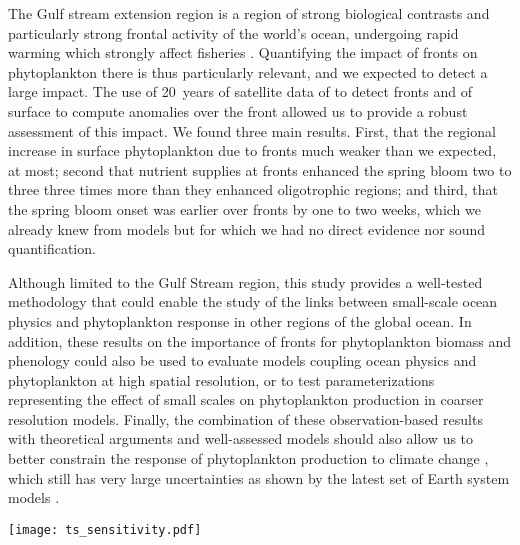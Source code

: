 \conclusions{}

The Gulf stream extension region is a region of strong biological contrasts and particularly strong frontal activity of the world's ocean, undergoing rapid warming which strongly affect fisheries \parencite{pershing_2015, neto_2021}.
Quantifying the impact of fronts on phytoplankton there is thus particularly relevant, and we expected to detect a large impact.
The use of 20~years of satellite data of  to detect fronts and of surface  to compute anomalies over the front allowed us to provide a robust assessment of this impact.
We found three main results.
First, that the regional increase in surface phytoplankton due to fronts much weaker than we expected,  at most; second that nutrient supplies at fronts enhanced the spring bloom two to three three times more than they enhanced oligotrophic regions; and third, that the spring bloom onset was earlier over fronts by one to two weeks, which we already knew from models \parencite{karleskind_2011, mahadevan_2012} but for which we had no direct evidence nor sound quantification.

Although limited to the Gulf Stream region, this study provides a well-tested methodology that could enable the study of the links between small-scale ocean physics and phytoplankton response in other regions of the global ocean.
In addition, these results on the importance of fronts for phytoplankton biomass and phenology could also be used to evaluate models coupling ocean physics and phytoplankton at high spatial resolution, or to test parameterizations representing the effect of small scales on phytoplankton production in coarser resolution models.
Finally, the combination of these observation-based results with theoretical arguments and well-assessed models should also allow us to better constrain the response of phytoplankton production to climate change \parencite{couespel_2021}, which still has very large uncertainties as shown by the latest set of Earth system models \parencite{kwiatkowski_2020}.



\appendixfigures{}

\begin{figure*}
 \texttt{[image: ts\_sensitivity.pdf]}
 \caption{
   Climatological mean of  median values (top row) over weak fronts (blue), strong fronts (green) and background (red), surface fraction occupied by weak fronts and strong fronts (middle row), and global  excess due to weak and strong fronts (bottom row).
   Each line represent a set of parameter with the bolder line indicating the retained set of parameters.
   The tested rolling window sizes are~\qtylist{20,30,40}{\km}.
   Different normalization coefficients are tested for a~\qty{30}{\km} window size: double the variance, double the bimodality, and double the skewness.
 }%
 \label{fig:ts-sensitivity}
\end{figure*}


